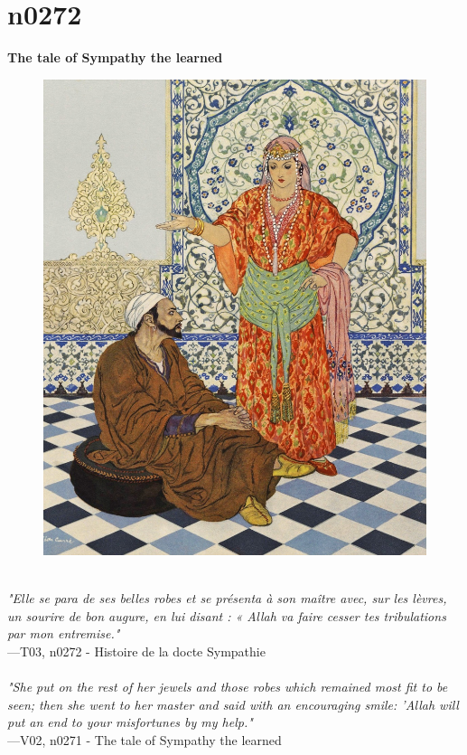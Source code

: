 \documentclass[../Carre_nights.tex]{subfiles}
\begin{document}
\newpage

\section{n0272}
\textbf{\Large{The tale of Sympathy the learned}} \\

\begin{figure}[ht]
\centering
\includegraphics[height=\figsize]{illustrations/volume_3/T03, n0272 - Histoire de la docte Sympathie.jpg}
\end{figure}

\textit{\\
"Elle se para de ses belles robes et se présenta à son maître avec, sur les lèvres, un sourire de bon augure, en lui disant : « Allah va faire cesser tes tribulations par mon entremise."} \\
—T03, n0272 - Histoire de la docte Sympathie \\~\\
\textit{"She put on the rest of her jewels and those robes which remained most fit to be seen; then she went to her master and said with an encouraging smile: 'Allah will put an end to your misfortunes by my help."} \\
—V02, n0271 - The tale of Sympathy the learned
\end{document}
